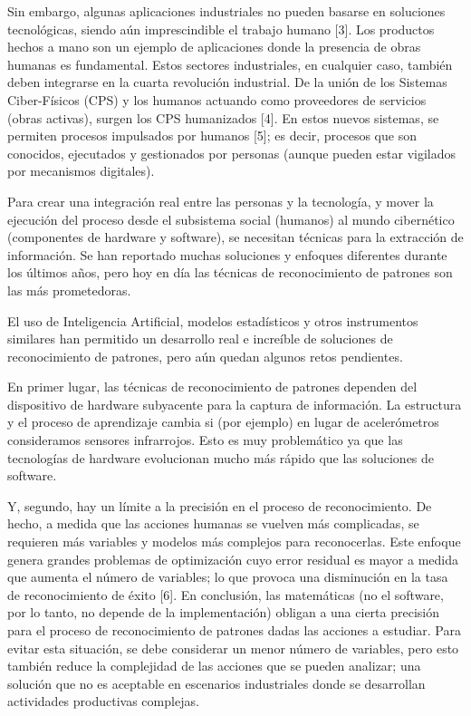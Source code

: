 \documentclass[10pt]{article}
\begin{document}
Sin embargo, algunas aplicaciones industriales no pueden basarse en soluciones tecnológicas, siendo aún imprescindible el trabajo humano [3]. Los productos hechos a mano son un ejemplo de aplicaciones donde la presencia de obras humanas es fundamental. Estos sectores industriales, en cualquier caso, también deben integrarse en la cuarta revolución industrial. De la unión de los Sistemas Ciber-Físicos (CPS) y los humanos actuando como proveedores de servicios (obras activas), surgen los CPS humanizados [4]. En estos nuevos sistemas, se permiten procesos impulsados por humanos [5]; es decir, procesos que son conocidos, ejecutados y gestionados por personas (aunque pueden estar vigilados por mecanismos digitales). 
\newline

Para crear una integración real entre las personas y la tecnología, y mover la ejecución del proceso desde el subsistema social (humanos) al mundo cibernético (componentes de hardware y software), se necesitan técnicas para la extracción de información. Se han reportado muchas soluciones y enfoques diferentes durante los últimos años, pero hoy en día las técnicas de reconocimiento de patrones son las más prometedoras. 
\newline

El uso de Inteligencia Artificial, modelos estadísticos y otros instrumentos similares han permitido un desarrollo real e increíble de soluciones de reconocimiento de patrones, pero aún quedan algunos retos pendientes. 
\newline

En primer lugar, las técnicas de reconocimiento de patrones dependen del dispositivo de hardware subyacente para la captura de información. La estructura y el proceso de aprendizaje cambia si (por ejemplo) en lugar de acelerómetros consideramos sensores infrarrojos. Esto es muy problemático ya que las tecnologías de hardware evolucionan mucho más rápido que las soluciones de software. 
\newline

Y, segundo, hay un límite a la precisión en el proceso de reconocimiento. De hecho, a medida que las acciones humanas se vuelven más complicadas, se requieren más variables y modelos más complejos para reconocerlas. Este enfoque genera grandes problemas de optimización cuyo error residual es mayor a medida que aumenta el número de variables; lo que provoca una disminución en la tasa de reconocimiento de éxito [6]. En conclusión, las matemáticas (no el software, por lo tanto, no depende de la implementación) obligan a una cierta precisión para el proceso de reconocimiento de patrones dadas las acciones a estudiar. Para evitar esta situación, se debe considerar un menor número de variables, pero esto también reduce la complejidad de las acciones que se pueden analizar; una solución que no es aceptable en escenarios industriales donde se desarrollan actividades productivas complejas. 
\newline
\end{document}
